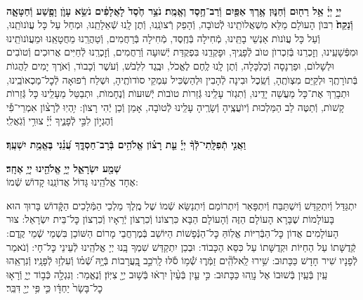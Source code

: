 \documentclass[twoside, openany, parskip=half, 11pt]{book}
\begin{document}
\begin{sometimes}

\\
 \textbf{יְיָ֣ יְיָ֔ אֵ֥ל רַח֖וּם וְֿחַנּ֑וּן אֶ֥רֶךְ אַפַּ֖יִם וְֿרַב־חֶ֥סֶד וֶאֱמֶֽת׃ נֹצֵ֥ר חֶ֙סֶד֙ לָאֲלָפִ֔ים נֹשֵׂ֥א עָוֺ֛ן וָפֶ֖שַׁע וְֿחַטָּאָ֑ה וְֿנַקֵּה֙׃}
רִבּוֺן הָעוׂלָם מַלֵּא מִשְׁאֲלוׂתֵֽינוּ לְֿטוׂבָה, וְֿהָפֵק רְֿצוׂנֵֽנוּ, וְֿתֶן לָֽנוּ שְֿׁאֵלָתֵֽנוּ, וּמְחַל עַל כָּל עֲוׂנוׂתֵֽנוּ, וְֿעַל כָּל עֲוׂנוׂת אַנְשֵׁי בָתֵּֽינוּ, מְֿחִילָה בְּֿחֶֽסֶד, מְֿחִילָה בְּֿרַחֲמִים, וְֿטַהֲרֵֽנוּ מֵחֲטָאֵֽנוּ וּמֵעֲוׂנוׂתֵֽינוּ וּמִפְּֿשָׁעֵֽינוּ, וְזׇכְרֵנוּ בְּֿזִכְרוׂן טוׂב לְֿפָנֶֽיךָ, וּפׇקְדֵֽנוּ בִּפְקֻדַּת יְֿשׁוּעָה וְֿרַחֲמִים, וְֿזׇכְרֵֽנוּ לְֿחַיִּים אֲרוּכִים וְֿטוׂבִים וּלְשָׁלוׂם, וּפַרְנָסָה וְֿכַלְכָּלָה, וְֿתֶן לָֽנוּ לֶֽחֶם לֶאֱכׂל, וּבֶֽגֶד לִלְבּׂשׁ, וְֿעׂשֶׁר וְֿכָבוׂד, וְֿאׂרֶךְ יָמִים לַהֲגוׂת בְּֿתוׂרָתֶֽךָ וּלְקַיֵּם מִצְוׂתֶֽהָ, וְֿשֵֽׂכֶל וּבִינָה לְֿהָבִין וּלְהַשְׂכִּיל עִמְקֵי סוׂדוׂתֶֽיהָ, וּשְׁלַח רְֿפוּאָה לְֿכׇל־מַכְאוׂבֵֽינוּ, וּתְבָרֵךְ אֶת־כָּל מַעֲשֵׁה יָדֵֽינוּ, וְֿתִגְזׂר עָלֵֽינוּ גְּֿזֵרוׂת טוׂבוׂת יְֿשׁוּעוׂת וְֿנֶחָמוׂת, וּתְבַטֵּל מֵעָלֵֽינוּ כָּל גְּֿזֵרוׂת קָשׁוׂת, וְֿתַטֶּה לֵב הַמַּלְכוּת וְֿיוׂעֲצֶֽיהָ וְֿשָׂרֶֽיהָ עָלֵֽינוּ לְֿטוׂבָה, אָמֵן וְֿכֵן יְֿהִי רָצוׂן:
%
 יִ֥הְיֽוּ לְֿרָצ֨וֹן אִמְרֵי־פִ֡י וְֿהֶגְי֣וֹן לִבִּ֣י לְֿפָנֶ֑יךָ יְ֜יָ֗ צוּרִ֥י וְֿגֹֽאֲלִֽי׃


\textbf{וַאֲנִ֤י תְֿפִלָּֽתִי־לְֿֿךָ֨ יְיָ֡ עֵ֤ת רָצ֗וֹן אֱלֹהִ֥ים בְּֿרָב־חַסְדֶּ֑ךָ עֲ֝נֵ֗נִי בֶּאֱמֶ֥ת יִשְׁעֶֽךָ׃}

\end{sometimes}

\brikhshmei

\textbf{שְׁמַ֖ע יִשְׂרָאֵ֑ל יְיָ֥ אֱלֹהֵ֖ינוּ יְיָ֥ אֶחָֽד׃}\\

אֶחָד אֱלֹהֵֽינוּ גָּדוֹל אֲדוֹנֵֽנוּ קָדוֹשׁ שְֿׁמוֹ:

\gadlu

\label{al hakol}
יִתְגַּדַּל וְֿיִתְקַדַּשׁ וְֿיִשְׁתַּבַּח וְֿיִתְפָּאַר וְֿיִתְרוֹמַם וְֿיִתְנַשֵּׂא שְֿׁמוֹ שֶׁל מֶֽלֶךְ מַלְכֵי הַמְּֿלָכִים הַקְָּֿדוֹשׁ בָּרוּךְ הוּא בָּעוֹלָמוֹת שֶׁבָּרָא הָעוֹלָם הַזֶּה וְֿהָעוֹלָם הַבָּא כִּרְצוֹנוֹ וְֿכִרְצוֹן יְֿרֵאָיו וְֿכִרְצוֹן כׇּל־בֵּית יִשְׂרָאֵל: צוּר הָעוֹלָמִים אֲדוֹן כׇּל־הַבְּֿרִיּוֹת אֱלֽוֹהַּ כׇּל־הַנְּֿפָשׁוֹת הַיּוֹשֵׁב בְּֿמֶרְחֲבֵי מָרוֹם הַשּׁוֹכֵן בִּשְׁמֵי שְֿׁמֵי קֶֽדֶם: קְֿדֻשָּׁתוֹ עַל הַחַיּוֹת וּקְדֻשָּׁתוֹ עַל כִּסֵּא הַכָּבוֹד: וּבְכֵן יִתְקַדַּשׁ שִׁמְךָ בָּֽנוּ יְיָ אֱלֹהֵֽינוּ לְֿעֵינֵי כׇּל־חָי: וְֿנֹאמַר לְֿפָנָיו שִׁיר חָדָשׁ כַּכָּתוּב:
 שִׁ֥ירוּ לֵֽאלֹהִֽ֘ים זַמְּֿר֢וּ שְֿׁ֫מ֥וֹ סֹ֡לּוּ לָֽרֹכֵ֣ב בָּֽ֭עֲרָבוֹת בְּֿיָ֥הּ שְֿׁ֝מ֗וֹ וְֿעִלְז֥וּ לְֿפָנָֽיו׃ וְֿנִרְאֵֽהוּ עַֽיִן בְּֿעַֽיִן בְּֿשׁוּבוֹ אֶל נָוֵֽהוּ כַּכָּתוּב:
%
 כִּ֣י עַ֤יִן בְּֿעַ֨יִן֙ יִרְא֔וּ בְּֿשׁ֥וּב יְיָ֖ צִיּֽוֹן׃ וְֿנֶאֱמַר:
וְנִגְלָ֖ה כְּֿב֣וֹד יְיָ֑ וְֿרָא֤וּ כׇל־בָּשָׂר֙ יַחְדָּ֔ו כִּ֛י פִּ֥י יְיָ֖ דִּבֵּֽר׃
\end{document}
